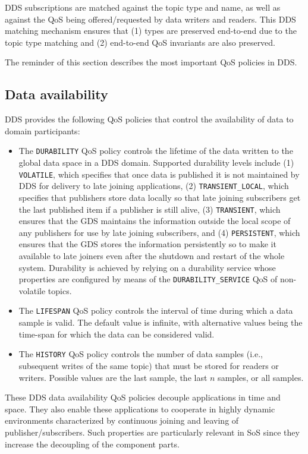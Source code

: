 \ac{DDS} subscriptions are matched against the topic type and
name, as well as against the \ac{QoS} being offered\-/requested by
data writers and readers.  This DDS matching mechanism ensures that
(1) types are preserved end-to-end due to the topic type matching and
(2) end-to-end \ac{QoS} invariants are also preserved.

The reminder of this section describes the most important \ac{QoS}
policies in \ac{DDS}.

\subsection{Data availability} 
DDS provides the following QoS policies that control the availability
of data to domain participants:
\begin{itemize}

	\item The \texttt{DURABILITY} \ac{QoS} policy controls the
          lifetime of the data written to the global data space in a
          \ac{DDS} domain.  Supported durability levels include (1)
          \texttt{VOLATILE}, which specifies that once data is
          published it is not maintained by \ac{DDS} for delivery to
          late joining applications, (2) \texttt{TRANSIENT\_LOCAL},
          which specifies that publishers store data locally so that
          late joining subscribers get the last published item if a
          publisher is still alive, (3) \texttt{TRANSIENT}, which
          ensures that the \ac{GDS} maintains the information outside
          the local scope of any publishers for use by late joining
          subscribers, and (4) \texttt{PERSISTENT}, which ensures that
          the \ac{GDS} stores the information persistently so to make
          it available to late joiners even after the shutdown and
          restart of the whole system.  Durability is achieved by
          relying on a durability service whose properties are
          configured by means of the \texttt{DURABILITY\_SERVICE}
          \ac{QoS} of non-volatile topics.

	\item The \texttt{LIFESPAN} \ac{QoS} policy controls the
          interval of time during which a data sample is valid. The
          default value is infinite, with alternative values being the
          time-span for which the data can be considered valid.

	\item The \texttt{HISTORY} \ac{QoS} policy controls the number
          of data samples (i.e., subsequent writes of the same topic)
          that must be stored for readers or writers. Possible values
          are the last sample, the last $n$ samples, or all samples.
\end{itemize}
These \ac{DDS} data availability \ac{QoS} policies decouple
applications in time and space.  They also enable these applications
to cooperate in highly dynamic environments characterized by
continuous joining and leaving of publisher\-/subscribers.  Such
properties are particularly relevant in \ac{SoS} since they increase
the decoupling of the component parts.

